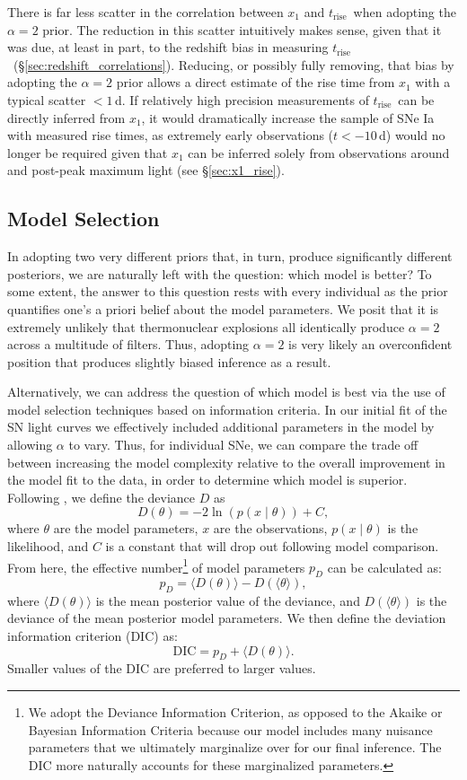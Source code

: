 \documentclass[twocolumn]{./aastex63}
\newcommand{\trise}{$t_\mathrm{rise}$}
\begin{document}
There is far less scatter in the correlation between $x_1$ and \trise\ when
adopting the $\alpha = 2$ prior. The reduction in this scatter intuitively
makes sense, given that it was due, at least in part, to the redshift bias in
measuring \trise\ (\S\ref{sec:redshift_correlations}). Reducing, or possibly
fully removing, that bias by adopting the $\alpha = 2$ prior allows a direct
estimate of the rise time from $x_1$ with a typical scatter $< 1$\,d. If
relatively high precision measurements of \trise\ can be directly inferred
from $x_1$, it would dramatically increase the sample of SNe Ia with measured
rise times, as extremely early observations ($t < -10$\,d) would no longer be
required given that $x_1$ can be inferred solely from observations around and
post-peak maximum light (see \S\ref{sec:x1_rise}).

\subsection{Model Selection}\label{sec:dic}

In adopting two very different priors that, in turn, produce significantly
different posteriors, we are naturally left with the question: which model is
better? To some extent, the answer to this question rests with every individual
as the prior quantifies one's a priori belief about the model parameters. We
posit that it is extremely unlikely that thermonuclear explosions all
identically produce $\alpha = 2$ across a multitude of filters. Thus, adopting
$\alpha = 2$ is very likely an overconfident position that produces slightly
biased inference as a result.

Alternatively, we can address the question of which model is best via the use
of model selection techniques based on information criteria. In our initial
fit of the SN light curves we effectively included additional parameters in
the model by allowing $\alpha$ to vary. Thus, for individual SNe, we can
compare the trade off between increasing the model complexity relative to the
overall improvement in the model fit to the data, in order to determine which
model is superior. Following \citet{Spiegelhalter02}, we define the deviance
$D$ as
%
$$D(\theta) = -2 \ln (p(x\mid \theta)) + C,$$
%
where $\theta$ are the model parameters, $x$ are the observations, $p(x\mid
\theta)$ is the likelihood, and $C$ is a constant that will drop out following
model comparison. From here, the effective number\footnote{We adopt the Deviance
Information Criterion, as opposed to the Akaike or Bayesian Information Criteria
because our model includes many nuisance parameters that we ultimately
marginalize over for our final inference. The DIC more naturally accounts for
these marginalized parameters.} of model parameters $p_D$ can be calculated as:
%
$$p_D = \langle D(\theta) \rangle - D(\langle \theta \rangle),$$
%
where $\langle D(\theta) \rangle$ is the mean posterior value of the deviance,
and $D(\langle \theta \rangle)$ is the deviance of the mean posterior model
parameters. We then define the deviation information criterion (DIC) as:
%
$$\mathrm{DIC} = p_D + \langle D(\theta) \rangle.$$
Smaller values of  the DIC are  preferred to larger values.
\end{document}
